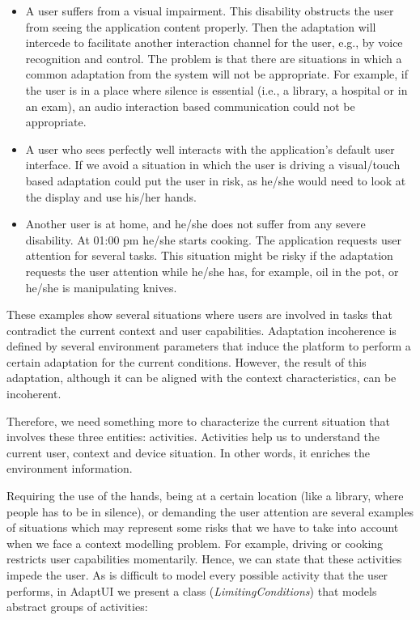 \begin{itemize}
 \item A user suffers from a visual impairment. This disability obstructs
 the user from seeing the application content properly. Then the adaptation
 will intercede to facilitate another interaction channel for the user, e.g.,
 by voice recognition and control. The problem is that there are situations
 in which a common adaptation from the system will not be appropriate.
 For example, if the user is in a place where silence is essential (i.e., a
 library, a hospital or in an exam), an audio interaction based communication
 could not be appropriate. 
 
 \item A user who sees perfectly well interacts with the application’s
 default user interface. If we avoid a situation in which the user is driving
 a visual/touch based adaptation could put the user in risk, as he/she would
 need to look at the display and use his/her hands.
 
 \item Another user is at home, and he/she does not suffer from any severe
 disability. At 01:00 pm he/she starts cooking. The application requests
 user attention for several tasks. This situation might be risky if the adaptation
 requests the user attention while he/she has, for example, oil in the pot, or
 he/she is manipulating knives.
\end{itemize}

These examples show several situations where users are involved in tasks that
contradict the current context and user capabilities. Adaptation incoherence is
defined by several environment parameters that induce the platform to perform a
certain adaptation for the current conditions. However, the result of this
adaptation, although it can be aligned with the context characteristics, can be
incoherent.

Therefore, we need something more to characterize the current situation that
involves these three entities: activities. Activities help us to understand the
current user, context and device situation. In other words, it enriches the
environment information.

Requiring the use of the hands, being at a certain location (like a library, where
people has to be in silence), or demanding the user attention are several examples
of situations which may represent some risks that we have to take into account
when we face a context modelling problem. For example, driving or cooking restricts
user capabilities momentarily. Hence, we can state that these activities impede
the user. As is difficult to model every possible activity that the user performs,
in AdaptUI we present a class (\textit{LimitingConditions}) that models abstract
groups of activities:

